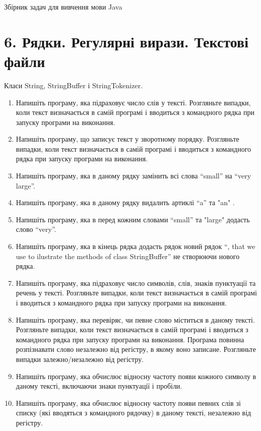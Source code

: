 \documentclass[]{article}
\date{}
\begin{document}
Збірник задач для вивчення мови Java

  \section{6. Рядки. Регулярні вирази. Текстові файли}

Класи String, StringBuffer і StringTokenizer. 

\begin{enumerate}
\def\labelenumi{\arabic{enumi}.}
\item 
 Напишіть програму, яка підраховує число слів у тексті. Розгляньте випадки, коли текст визначається в самій програмі і вводиться з командного рядка при запуску програми на виконання.
\item  Напишіть програму, що записує текст у зворотному порядку. Розгляньте випадки, коли текст визначається в самій програмі і вводиться з командного рядка при запуску програми на виконання.
\item  Напишіть програму, яка в даному рядку замінить всі слова “small” на “very large”.
\item  Напишіть програму, яка в даному рядку видалить артиклі “a” та "an" .
\item  Напишіть програму, яка в перед кожним словами “small” та "large" додасть слово “very”.
\item Напишіть програму, яка в кінець рядка додасть рядок  новий рядок “, that we use to ilustrate the methods of class StringBuffer” не створюючи нового рядка. 
\item Напишіть програму, яка підраховує число символів, слів, знаків пунктуації та речень у тексті. Розгляньте випадки, коли текст визначається в самій програмі і вводиться з командного рядка при запуску програми на виконання.
\item Напишіть програму, яка перевіряє, чи певне слово міститься  в даному тексті. Розгляньте випадки, коли текст визначається в самій програмі і вводиться з командного рядка при запуску програми на виконання. Програма повинна розпізнавати слово незалежно від регістру, в якому воно записане. Розгляньте випадки залежно/незалежно від регістру.
\item Напишіть програму, яка обчислює відносну частоту появи кожного символу в даному тексті, включаючи знаки пунктуації і пробіли.
\item Напишіть програму, яка обчислює відносну частоту появи певних слів зі списку (які вводяться з командного рядочку) в даному тексті, незалежно від регістру.
\end{enumerate}
\end{document}
